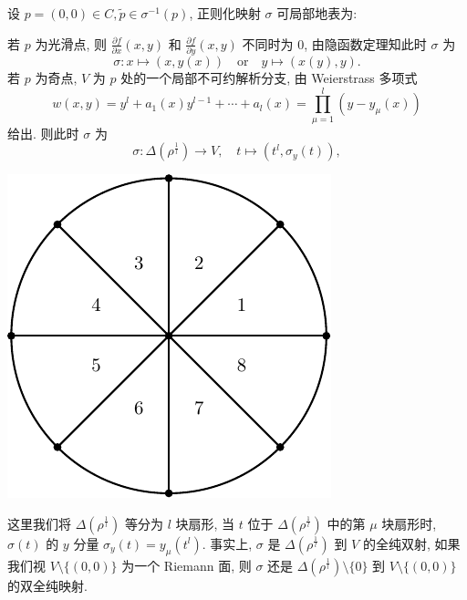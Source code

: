 \begin{thm}[局部正则化]
\label{thm:local-normalization}
设 $p = (0,0) \in C, \tilde{p} \in \sigma^{-1}(p)$,
正则化映射 $\sigma$ 可局部地表为:
\begin{itemize}
    \ii 若 $p$ 为光滑点, 则 $\frac{\partial f}{\partial x}(x,y)$
    和 $\frac{\partial f}{\partial y}(x,y)$ 不同时为 $0$,
    由隐函数定理知此时 $\sigma$ 为
    \[\sigma: x \mapsto (x,y(x)) \quad \text{or} \quad y \mapsto (x(y),y).\]
    \ii 若 $p$ 为奇点, $V$ 为 $p$ 处的一个局部不可约解析分支, 由 Weierstrass 多项式
    \begin{equation}
    \label{eq:irre-weierstrass}
    w(x,y) = y^l + a_1(x)y^{l-1} + \cdots + a_l(x) = \prod_{\mu=1}^l(y-y_\mu(x))
    \end{equation}
    给出. 则此时 $\sigma$ 为
    \begin{equation}
    \label{eq:local-normalization}
    \sigma: \Delta(\rho^{\frac{1}{l}}) \to V, \quad t\mapsto (t^l, \sigma_y(t)),
    \end{equation}
    \begin{center}
    \includegraphics[scale=0.66]{fig-01.pdf}
    \end{center}
    这里我们将 $\Delta(\rho^{\frac{1}{l}})$ 等分为 $l$ 块扇形,
    当 $t$ 位于 $\Delta(\rho^{\frac{1}{l}})$ 中的第 $\mu$ 块扇形时,
    $\sigma(t)$ 的 $y$ 分量 $\sigma_y(t) = y_\mu(t^l)$.
    事实上, $\sigma$ 是 $\Delta(\rho^{\frac{1}{l}})$ 到 $V$ 的全纯双射,
    如果我们视 $V\setminus \{(0,0)\}$ 为一个 Riemann 面,
    则 $\sigma$ 还是 $\Delta(\rho^{\frac{1}{l}})\setminus \{0\}$ 到 $V\setminus \{(0,0)\}$
    的双全纯映射.
\end{itemize}
\end{thm}

